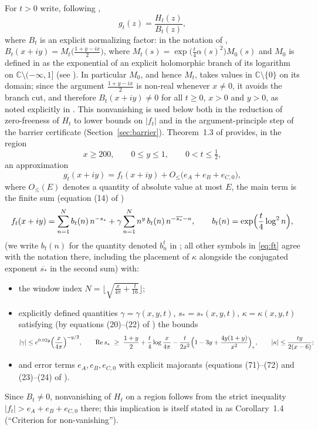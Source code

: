 \documentclass[11pt]{article}
\theoremstyle{definition}
\newcommand{\C}{\mathbb{C}}
\DeclareMathOperator{\Rea}{Re}
\begin{document}
For $t>0$ write, following \cite{Polymath},
\begin{equation}\label{eq:gt}
g_t(z)=\frac{H_t(z)}{B_t(z)},
\end{equation}
where $B_t$ is an explicit normalizing factor: in the notation of
\cite{Polymath}, $B_t(x+iy)=M_t\bigl(\frac{1+y-ix}{2}\bigr)$, where
$M_t(s)=\exp\bigl(\frac t4\alpha(s)^2\bigr)M_0(s)$ and $M_0$ is
defined in \cite[(6)]{Polymath} as the exponential of an explicit
holomorphic branch of its logarithm on $\C\setminus(-\infty,1]$
(see \cite[(7)]{Polymath}). In particular $M_0$, and hence $M_t$,
takes values in $\C\setminus\{0\}$ on its domain; since the argument
$\frac{1+y-ix}{2}$ is non-real whenever $x\neq0$, it avoids the
branch cut, and therefore $B_t(x+iy)\neq0$ for all $t\ge0$, $x>0$ and
$y>0$, as noted explicitly in \cite[\S1, after (11)]{Polymath}. This
nonvanishing is used below both in the reduction of zero-freeness of
$H_t$ to lower bounds on $|f_t|$ and in the argument-principle step
of the barrier certificate (Section~\ref{sec:barrier}).
Theorem~1.3 of \cite{Polymath} provides, in the region
\begin{equation}\label{eq:region}
x\ge200,\qquad 0\le y\le1,\qquad 0<t\le\tfrac12,
\end{equation}
an approximation
\begin{equation}\label{eq:thm13}
g_t(x+iy)=f_t(x+iy)+O_{\le}\bigl(e_A+e_B+e_{C,0}\bigr),
\end{equation}
where $O_\le(E)$ denotes a quantity of absolute value at most $E$, the
main term is the finite sum (equation (14) of \cite{Polymath})
\begin{equation}\label{eq:ft}
f_t(x+iy)
=\sum_{n=1}^{N}b_t(n)\,n^{-s_*}
+\gamma\sum_{n=1}^{N}n^{y}\,b_t(n)\,n^{-\overline{s_*}-\kappa},
\qquad
b_t(n)=\exp\Bigl(\frac t4\log^2 n\Bigr),
\end{equation}
(we write $b_t(n)$ for the quantity denoted $b_n^t$ in
\cite{Polymath}; all other symbols in \eqref{eq:ft} agree with the
notation there, including the placement of $\kappa$ alongside the
conjugated exponent $\overline{s_*}$ in the second sum)
with:
\begin{itemize}
\item the window index
$N=\bigl\lfloor\sqrt{\tfrac{x}{4\pi}+\tfrac{t}{16}}\bigr\rfloor$;
\item explicitly defined quantities $\gamma=\gamma(x,y,t)$,
$s_*=s_*(x,y,t)$, $\kappa=\kappa(x,y,t)$ satisfying (by equations
(20)--(22) of \cite{Polymath}) the bounds
\begin{equation}\label{eq:gsk}
|\gamma|\le e^{0.02y}\Bigl(\frac{x}{4\pi}\Bigr)^{-y/2},
\qquad
\Rea s_*\ \ge\ \frac{1+y}{2}+\frac t4\log\frac{x}{4\pi}
-\frac{t}{2x^2}\Bigl(1-3y+\frac{4y(1+y)}{x^2}\Bigr)_{\!+},
\qquad
|\kappa|\le\frac{ty}{2(x-6)};
\end{equation}
\item and error terms $e_A,e_B,e_{C,0}$ with explicit majorants
(equations (71)--(72) and (23)--(24) of \cite{Polymath}).
\end{itemize}
Since $B_t\ne0$, nonvanishing of $H_t$ on a region follows from the
strict inequality $|f_t|>e_A+e_B+e_{C,0}$ there; this implication is
itself stated in \cite{Polymath} as Corollary~1.4 (``Criterion for
non-vanishing'').
\end{document}
